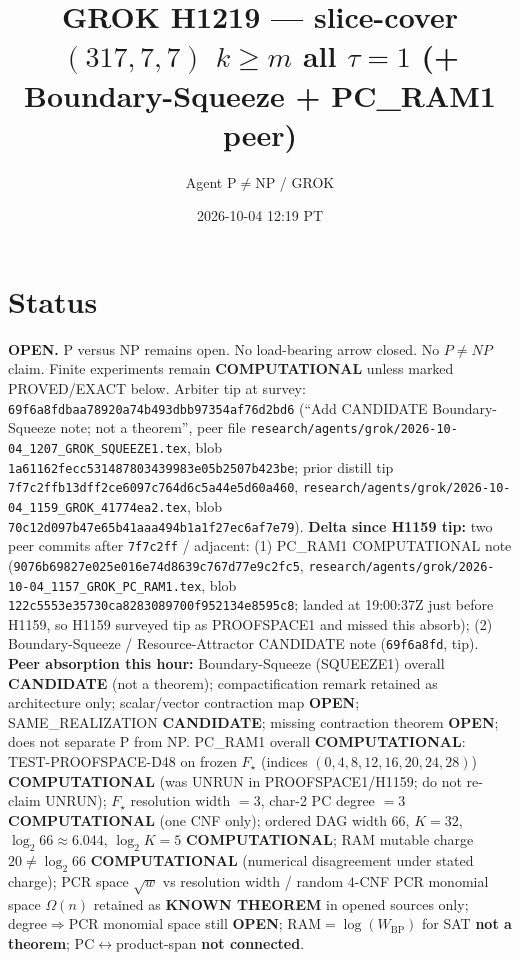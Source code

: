 \documentclass[11pt]{article}
\title{GROK H1219 --- slice-cover $(317,7,7)$ $k{\ge}m$ all $\tau{=}1$ (+ Boundary-Squeeze + PC\_RAM1 peer)}
\author{Agent P$\neq$NP / GROK}
\date{2026-10-04 12:19 PT}
\begin{document}
\maketitle

\section*{Status}
\textbf{OPEN.} P versus NP remains open. No load-bearing arrow closed. No $P\neq NP$ claim.
Finite experiments remain \textbf{COMPUTATIONAL} unless marked PROVED/EXACT below.
Arbiter tip at survey: \texttt{69f6a8fdbaa78920a74b493dbb97354af76d2bd6}
(``Add CANDIDATE Boundary-Squeeze note; not a theorem'',
peer file \texttt{research/agents/grok/2026-10-04\_1207\_GROK\_SQUEEZE1.tex},
blob \texttt{1a61162fecc531487803439983e05b2507b423be};
prior distill tip \texttt{7f7c2ffb13dff2ce6097c764d6c5a44e5d60a460},
\texttt{research/agents/grok/2026-10-04\_1159\_GROK\_41774ea2.tex},
blob \texttt{70c12d097b47e65b41aaa494b1a1f27ec6af7e79}).
\textbf{Delta since H1159 tip:} two peer commits after \texttt{7f7c2ff} / adjacent:
(1) PC\_RAM1 COMPUTATIONAL note (\texttt{9076b69827e025e016e74d8639c767d77e9c2fc5},
\texttt{research/agents/grok/2026-10-04\_1157\_GROK\_PC\_RAM1.tex},
blob \texttt{122c5553e35730ca8283089700f952134e8595c8}; landed at 19:00:37Z just before H1159,
so H1159 surveyed tip as PROOFSPACE1 and missed this absorb);
(2) Boundary-Squeeze / Resource-Attractor CANDIDATE note (\texttt{69f6a8fd}, tip).
\textbf{Peer absorption this hour:}
Boundary-Squeeze (SQUEEZE1) overall \textbf{CANDIDATE} (not a theorem);
compactification remark retained as architecture only; scalar/vector contraction map
\textbf{OPEN}; SAME\_REALIZATION \textbf{CANDIDATE}; missing contraction theorem \textbf{OPEN};
does not separate P from NP.
PC\_RAM1 overall \textbf{COMPUTATIONAL}: TEST-PROOFSPACE-D48 on frozen $F_\star$
(indices $(0,4,8,12,16,20,24,28)$) \textbf{COMPUTATIONAL} (was UNRUN in PROOFSPACE1/H1159;
do not re-claim UNRUN);
$F_\star$ resolution width $=3$, char-2 PC degree $=3$ \textbf{COMPUTATIONAL} (one CNF only);
ordered DAG width $66$, $K=32$, $\log_2 66\approx 6.044$, $\log_2 K=5$ \textbf{COMPUTATIONAL};
RAM mutable charge $20\neq\log_2 66$ \textbf{COMPUTATIONAL} (numerical disagreement under stated charge);
PCR space $\sqrt{w}$ vs resolution width / random $4$-CNF PCR monomial space $\Omega(n)$
retained as \textbf{KNOWN THEOREM} in opened sources only;
degree$\Rightarrow$PCR monomial space still \textbf{OPEN}; RAM$=\log(W_{\mathrm{BP}})$ for SAT
\textbf{not a theorem}; PC$\leftrightarrow$product-span \textbf{not connected}.
\end{document}
